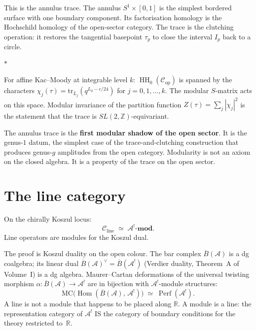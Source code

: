 \documentclass[11pt]{article}
\newcommand{\cA}{\mathcal{A}}
\newcommand{\cC}{\mathcal{C}}
\newcommand{\barB}{\overline{B}}
\newcommand{\Z}{\mathbb{Z}}
\newcommand{\R}{\mathbb{R}}
\newcommand{\MC}{\mathrm{MC}}
\newcommand{\Hom}{\operatorname{Hom}}
\newcommand{\HH}{\operatorname{HH}}
\newcommand{\Perf}{\operatorname{Perf}}
\newcommand{\sep}{\bigskip\begin{center}$*$\end{center}\medskip}
\begin{document}
This is the annulus trace.  The annulus $S^1 \times [0,1]$ is the
simplest bordered surface with one boundary component.  Its
factorisation homology is the Hochschild homology of the
open-sector category.  The trace is the clutching operation: it
restores the tangential basepoint $\tau_p$ to close the interval
$I_p$ back to a circle.

\sep

For affine Kac--Moody at integrable level $k$:
$\HH_0(\cC_{\mathrm{op}})$ is spanned by the characters
$\chi_j(\tau) = \mathrm{tr}_{L_j}(q^{L_0 - c/24})$
for $j = 0, 1, \ldots, k$.  The modular $S$-matrix acts on
this space.  Modular invariance of the partition function
$Z(\tau) = \sum_j |\chi_j|^2$ is the statement that the trace
is $SL(2,\Z)$-equivariant.

\medskip

The annulus trace is the \textbf{first modular shadow of the
open sector}.  It is the genus-$1$ datum, the simplest case of
the trace-and-clutching construction that produces genus-$g$
amplitudes from the open category.  Modularity is not an axiom
on the closed algebra.  It is a property of the trace on the
open sector.


\section{The line category}
\label{sec:line-category}

On the chirally Koszul locus:
\begin{equation}\label{eq:lines-koszul-wn}
\cC_{\mathrm{line}} \;\simeq\; \cA^!\text{-}\mathbf{mod}.
\end{equation}
Line operators are modules for the Koszul dual.

The proof is Koszul duality on the open colour.  The bar complex
$\barB(\cA)$ is a dg coalgebra; its linear dual
$\barB(\cA)^\vee = \barB(\cA^!)$ (Verdier duality, Theorem~A
of Volume~I) is a dg algebra.  Maurer--Cartan deformations of
the universal twisting morphism
$\alpha\colon \barB(\cA) \to \cA^!$ are in bijection with
$\cA^!$-module structures:
\[
\MC\bigl(\Hom(\barB(\cA),\, \cA^!)\bigr)
\;\simeq\;
\Perf(\cA^!).
\]
A line is not a module that happens to be placed along $\R$.
A module is a line: the representation category of $\cA^!$ IS the
category of boundary conditions for the theory restricted
to~$\R$.
\end{document}
